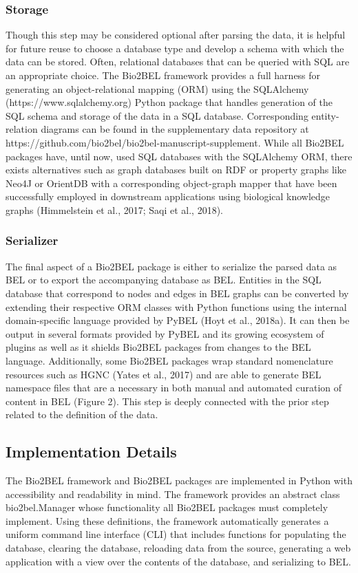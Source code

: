\subsubsection*{Storage}
Though this step may be considered optional after parsing the data, it is helpful for future reuse to choose a database type and develop a schema with which the data can be stored.
Often, relational databases that can be queried with SQL are an appropriate choice.
The Bio2BEL framework provides a full harness for generating an object-relational mapping (ORM) using the SQLAlchemy (https://www.sqlalchemy.org) Python package that handles generation of the SQL schema and storage of the data in a SQL database.
Corresponding entity-relation diagrams can be found in the supplementary data repository at https://github.com/bio2bel/bio2bel-manuscript-supplement.
While all Bio2BEL packages have, until now, used SQL databases with the SQLAlchemy ORM, there exists alternatives such as graph databases built on RDF or property graphs like Neo4J or OrientDB with a corresponding object-graph mapper that have been successfully employed in downstream applications using biological knowledge graphs (Himmelstein et al., 2017; Saqi et al., 2018).

\subsubsection*{Serializer}
The final aspect of a Bio2BEL package is either to serialize the parsed data as BEL or to export the accompanying database as BEL. Entities in the SQL database that correspond to nodes and edges in BEL graphs can be converted by extending their respective ORM classes with Python functions using the internal domain-specific language provided by PyBEL (Hoyt et al., 2018a).
It can then be output in several formats provided by PyBEL and its growing ecosystem of plugins as well as it shields Bio2BEL packages from changes to the BEL language.
Additionally, some Bio2BEL packages wrap standard nomenclature resources such as HGNC (Yates et al., 2017) and are able to generate BEL namespace files that are a necessary in both manual and automated curation of content in BEL (Figure 2).
This step is deeply connected with the prior step related to the definition of the data.

\subsection*{Implementation Details}
The Bio2BEL framework and Bio2BEL packages are implemented in Python with accessibility and readability in mind.
The framework provides an abstract class bio2bel.Manager whose functionality all Bio2BEL packages must completely implement.
Using these definitions, the framework automatically generates a uniform command line interface (CLI) that includes functions for populating the database, clearing the database, reloading data from the source, generating a web application with a view over the contents of the database, and serializing to BEL\@.

